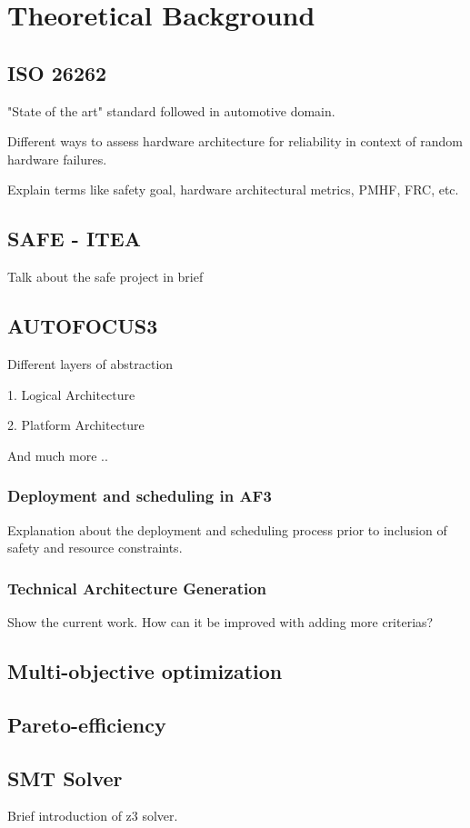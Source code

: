 \chapter{Theoretical Background}\label{chapter:theoretical_background}

\section{ISO 26262}

"State of the art" standard followed in automotive domain.  

Different ways to assess hardware architecture for reliability in context of random hardware failures.

Explain terms like safety goal, hardware architectural metrics, PMHF, FRC, etc. 

\section{SAFE - ITEA}

Talk about the safe project in brief

\section{AUTOFOCUS3}

Different layers of abstraction

1. Logical Architecture

2. Platform Architecture

And much more ..

\subsection{Deployment and scheduling in AF3}

Explanation about the deployment and scheduling process prior to inclusion of safety and resource constraints.

\subsection{Technical Architecture Generation}

Show the current work. How can it be improved with adding more criterias?

\section{Multi-objective optimization}

\section{Pareto-efficiency}

\section{SMT Solver}

Brief introduction of z3 solver.





